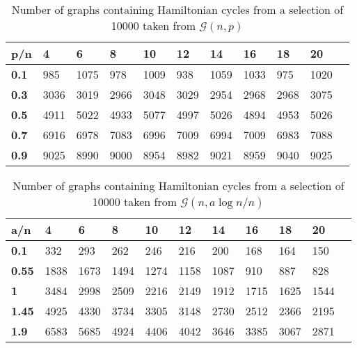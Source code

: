 \documentclass[10pt,a4paper]{report}
\begin{document}
\begin{table}[h]
\centering
\begin{tabular}{|l|l|l|l|l|l|l|l|l|l|l|}
\hline
\textbf{p/n}         &  \textbf{4} & \textbf{6} & \textbf{8} & \textbf{10} & \textbf{12} & \textbf{14} & \textbf{16} & \textbf{18} & \textbf{20} \\ \hline
\textbf{0.1}     & 985        & 1075       & 978        & 1009        & 938         & 1059        & 1033        & 975         & 1020        \\ \hline
\textbf{0.3}       & 3036       & 3019       & 2966       & 3048        & 3029        & 2954        & 2968        & 2968        & 3075        \\ \hline
\textbf{0.5}        & 4911       & 5022       & 4933       & 5077        & 4997        & 5026        & 4894        & 4953        & 5026        \\ \hline
\textbf{0.7}        & 6916       & 6978       & 7083       & 6996        & 7009        & 6994        & 7009        & 6983        & 7088        \\ \hline
\textbf{0.9}        & 9025       & 8990       & 9000       & 8954        & 8982        & 9021        & 8959        & 9040        & 9025        \\ \hline
\end{tabular}
\caption{Number of graphs containing Hamiltonian cycles from a selection of 10000 taken from $\mathcal{G}(n,p)$}
\end{table}

\begin{table}[h]
\centering
\begin{tabular}{|l|l|l|l|l|l|l|l|l|l|l|}
\hline
\textbf{a/n}   & \textbf{4} & \textbf{6} & \textbf{8} & \textbf{10} & \textbf{12} & \textbf{14} & \textbf{16} & \textbf{18} & \textbf{20} \\ \hline
\textbf{0.1}         & 332        & 293        & 262        & 246         & 216         & 200         & 168         & 164         & 150         \\ \hline
\textbf{0.55}       & 1838       & 1673       & 1494       & 1274        & 1158        & 1087        & 910         & 887         & 828         \\ \hline
\textbf{1}           & 3484       & 2998       & 2509       & 2216        & 2149        & 1912        & 1715        & 1625        & 1544        \\ \hline
\textbf{1.45}        & 4925       & 4330       & 3734       & 3305        & 3148        & 2730        & 2512        & 2366        & 2195        \\ \hline
\textbf{1.9}         & 6583       & 5685       & 4924       & 4406        & 4042        & 3646        & 3385        & 3067        & 2871        \\ \hline
\end{tabular}
\caption{Number of graphs containing Hamiltonian cycles from a selection of 10000 taken from $\mathcal{G}(n,a\log{n}/n)$}
\label{tab:my-table}
\end{table}
\end{document}
